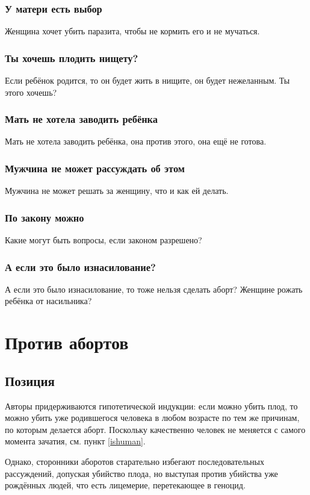 \documentclass[a4paper,12pt]{report}
\begin{document}
    \section{У матери есть выбор}
        Женщина хочет убить паразита, чтобы не кормить его и не мучаться.
    \section{Ты хочешь плодить нищету?}
        Если ребёнок родится, то он будет жить в нищите, он будет нежеланным. Ты этого хочешь?
    \section{Мать не хотела заводить ребёнка}
        Мать не хотела заводить ребёнка, она против этого, она ещё не готова.
    \section{Мужчина не может рассуждать об этом}
        Мужчина не может решать за женщину, что и как ей делать.   
    \section{По закону можно}
        Какие могут быть вопросы, если законом разрешено?
    \section{А если это было изнасилование?}
        А если это было изнасилование, то тоже нельзя сделать аборт? Женщине рожать ребёнка от насильника?


\part{Против абортов}
\chapter{Позиция}
Авторы придерживаются гипотетической индукции: если можно убить плод, то можно убить 
уже родившегося человека в любом возрасте по тем же причинам, по которым делается аборт.
Поскольку качественно человек не меняется с самого момента зачатия, см. пункт \ref{ishuman}.

Однако, сторонники аборотов старательно избегают последовательных рассуждений, 
допуская убийство плода, но выступая против убийства уже рождённых людей, что есть лицемерие,
перетекающее в геноцид.
\end{document}
